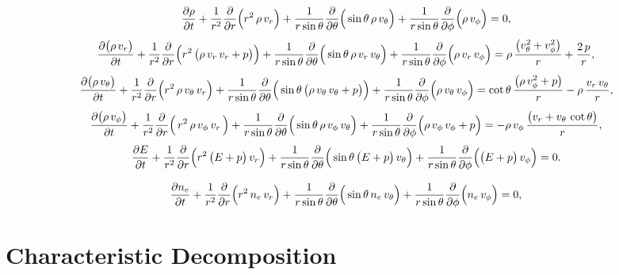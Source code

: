 \documentclass[10pt,preprint]{aastex}
\begin{document}
\begin{equation}
  \frac{\partial \rho}{\partial t}
  +\frac{1}{r^{2}}\frac{\partial }{\partial r}\Big(r^{2}\,\rho\,v_{r}\Big)
  +\frac{1}{r\sin\theta}\frac{\partial }{\partial \theta}\Big(\sin\theta\,\rho\,v_{\theta}\Big)
  +\frac{1}{r\sin\theta}\frac{\partial }{\partial \phi}\Big(\rho\,v_{\phi}\Big)=0,
\end{equation}
\begin{equation}
  \frac{\partial \big(\rho\,v_{r}\big)}{\partial t}
  +\frac{1}{r^{2}}\frac{\partial }{\partial r}\Big(r^{2}\,\big(\rho\,v_{r}\,v_{r}+p\big)\Big)
  +\frac{1}{r\sin\theta}\frac{\partial }{\partial \theta}\Big(\sin\theta\,\rho\,v_{r}\,v_{\theta}\Big)
  +\frac{1}{r\sin\theta}\frac{\partial }{\partial \phi}\Big(\rho\,v_{r}\,v_{\phi}\Big)
  =\rho\,\frac{\big(v_{\theta}^{2}+v_{\phi}^{2}\big)}{r}+\frac{2\,p}{r},
\end{equation}
\begin{equation}
  \frac{\partial \big(\rho\,v_{\theta}\big)}{\partial t}
  +\frac{1}{r^{2}}\frac{\partial }{\partial r}\Big(r^{2}\,\rho\,v_{\theta}\,v_{r}\Big)
  +\frac{1}{r\sin\theta}\frac{\partial }{\partial \theta}\Big(\sin\theta\,\big(\rho\,v_{\theta}\,v_{\theta}+p\big)\Big)
  +\frac{1}{r\sin\theta}\frac{\partial }{\partial \phi}\Big(\rho\,v_{\theta}\,v_{\phi}\Big)
  =\cot\theta\,\frac{\big(\rho\,v_{\phi}^{2}+p\big)}{r}-\rho\,\frac{v_{r}\,v_{\theta}}{r},
\end{equation}
\begin{equation}
  \frac{\partial \big(\rho\,v_{\phi}\big)}{\partial t}
  +\frac{1}{r^{2}}\frac{\partial }{\partial r}\Big(\,r^{2}\,\rho\,v_{\phi}\,v_{r}\,\Big)
  +\frac{1}{r\sin\theta}\frac{\partial }{\partial \theta}\Big(\sin\theta\,\rho\,v_{\phi}\,v_{\theta}\Big)
  +\frac{1}{r\sin\theta}\frac{\partial }{\partial \phi}\Big(\rho\,v_{\phi}\,v_{\phi}+p\Big)
  =-\rho\,v_{\phi}\,\frac{\big(v_{r}+v_{\theta}\,\cot\theta\big)}{r},
\end{equation}
\begin{equation}
  \frac{\partial E}{\partial t}
  +\frac{1}{r^{2}}\frac{\partial }{\partial r}\Big(r^{2}\,\big(E+p\big)\,v_{r}\Big)
  +\frac{1}{r\sin\theta}\frac{\partial }{\partial \theta}\Big(\sin\theta\,\big(E+p\big)\,v_{\theta}\Big)
  +\frac{1}{r\sin\theta}\frac{\partial }{\partial \phi}\Big(\big(E+p\big)\,v_{\phi}\Big)=0.
\end{equation}

\begin{equation}
  \frac{\partial n_{e}}{\partial t}
  +\frac{1}{r^{2}}\frac{\partial }{\partial r}\Big(r^{2}\,n_{e}\,v_{r}\Big)
  +\frac{1}{r\sin\theta}\frac{\partial }{\partial \theta}\Big(\sin\theta\,n_{e}\,v_{\theta}\Big)
  +\frac{1}{r\sin\theta}\frac{\partial }{\partial \phi}\Big(n_{e}\,v_{\phi}\Big)=0,
\end{equation}

\section{Characteristic Decomposition}
\label{app:Characteristic}
\end{document}

